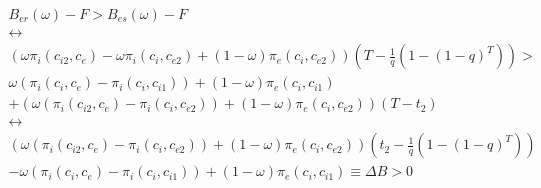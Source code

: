 
\begin{align*}
B_{er}(\omega)-F > B_{es}(\omega)-F \\
\leftrightarrow \\
\left(\omega\pi_{i}(c_{i2},c_{e})-\omega \pi_{i}(c_{i},c_{e2})+(1-\omega)\pi_{e}(c_{i},c_{e2}) \right) \left( T - \frac{1}{q} \left( 1-(1-q)^{T} \right) \right)> \\ 
\omega(\pi_i(c_i,c_{e})-\pi_i(c_i,c_{i1}))+(1-\omega)\pi_e(c_i,c_{i1}) \\
+(\omega(\pi_i(c_{i2},c_e)- \pi_i(c_{i},c_{e2}))+(1-\omega)\pi_e(c_{i},c_{e2}))(T-t_2) \\
\leftrightarrow \\
\left(\omega (\pi_{i}(c_{i2},c_{e})- \pi_{i}(c_{i},c_{e2}))+(1-\omega)\pi_{e}(c_{i},c_{e2}) \right) \left( t_2- \frac{1}{q} \left( 1-(1-q)^T \right) \right)  \\
-\omega(\pi_i(c_i,c_{e})-\pi_i(c_i,c_{i1}))+(1-\omega)\pi_e(c_i,c_{i1}) \equiv \Delta B >0 \\
\end{align*}

